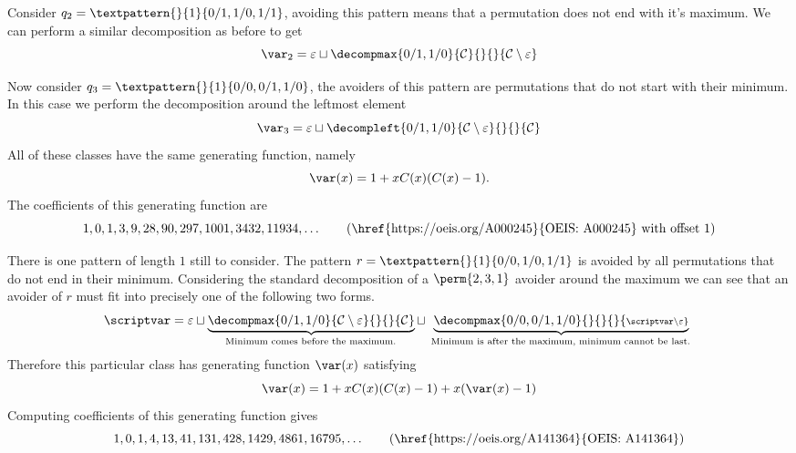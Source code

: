 Consider \(q_2 = \textpattern{}{1}{0/1,1/0,1/1}\), avoiding this pattern
means that a permutation does not end with it's maximum. We can perform a similar
decomposition as before to get
\begin{equation*}
    \mathcal{\var}_2 =\varepsilon \sqcup \decompmax{0/1,1/0}{\mathcal{C}}{}{}{\mathcal{C}\setminus\varepsilon}
\end{equation*}

Now consider \(q_3 = \textpattern{}{1}{0/0,0/1,1/0}\), the avoiders of this
pattern are permutations that do not start with their minimum. In this case we
perform the decomposition around the leftmost element
\begin{equation*}
    \mathcal{\var}_3 =\varepsilon \sqcup \decompleft{0/1,1/0}{\mathcal{C}\setminus\varepsilon}{}{}{\mathcal{C}}
\end{equation*}
All of these classes have the same generating function, namely
\begin{equation}
    \var(x) = 1 + xC(x)(C(x)-1). \label{eqn:maxlgen}
\end{equation}
The coefficients of this generating function are
\begin{equation*}
    1, 0, 1, 3, 9, 28, 90, 297, 1001, 3432, 11934,\dotsc \tag{\href{https://oeis.org/A000245}{OEIS: A000245} with offset \(1\)}
\end{equation*}

\nextvar[\varmaxl]
There is one pattern of length \(1\) still to consider. The pattern
\(r = \textpattern{}{1}{0/0,1/0,1/1}\) is avoided by all permutations
that do not end in their minimum. Considering the standard decomposition
of a \(\perm{2,3,1}\) avoider around the maximum we can see that an avoider
of \(r\) must fit into precisely one of the following two forms.
\begin{equation*}
    \scriptvar = \varepsilon \sqcup
    \underbrace{\decompmax{0/1,1/0}{\mathcal{C}\setminus\varepsilon}{}{}{\mathcal{C}}}_\text{
        Minimum comes before the maximum.
    } \sqcup
    \underbrace{\decompmax{0/0,0/1,1/0}{}{}{}{\scriptstyle{\scriptvar\setminus\varepsilon}}}_\text{
        Minimum is after the maximum, minimum cannot be last.
    }
\end{equation*}
Therefore this particular class has generating function \(\var(x)\) satisfying
\begin{equation*}
    \var(x) = 1 + xC(x)(C(x)-1) + x(\var(x)-1)
\end{equation*}
Computing coefficients of this generating function gives
\begin{equation*}
    	1, 0, 1, 4, 13, 41, 131, 428, 1429, 4861, 16795,\dotsc \tag{\href{https://oeis.org/A141364}{OEIS: A141364}}
\end{equation*}

